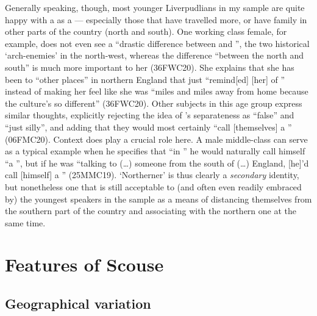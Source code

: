 Generally speaking, though, most younger Liverpudlians in my sample are quite happy with a  as a  --- especially those that have travelled more, or have family in other parts of the country (north and south).
One working class female, for example, does not even see a ``drastic difference between  and '', the two historical `arch-enemies' in the north-west, whereas the difference ``between the north and south'' is much more important to her (36FWC20).
She explains that she has been to ``other places'' in northern England that just ``remind[ed] [her] of '' instead of making her feel like she was ``miles and miles away from home because the culture's so different'' (36FWC20).
Other subjects in this age group express similar thoughts, explicitly rejecting the idea of 's separateness as ``false'' and ``just silly'', and adding that they would most certainly ``call [themselves] a '' (06FMC20).
Context does play a crucial role here.
A male middle-class  can serve as a typical example when he specifies that ``in '' he would naturally call himself ``a '', but if he was ``talking to (\ldots) someone from the south of (\ldots) England, [he]'d call [himself] a '' (25MMC19).
`Northerner' is thus clearly a \emph{secondary} identity, but nonetheless one that is still acceptable to (and often even readily embraced by) the youngest  speakers in the sample as a means of distancing themselves from the southern part of the country and associating with the northern one at the same time.

\section{Features of Scouse}

\subsection{Geographical variation}

